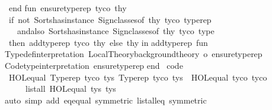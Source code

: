 \begin{isabellebody}
\ \ end{\isacharsemicolon}{\kern0pt}\isanewline
\isanewline
fun\ ensure{\isacharunderscore}{\kern0pt}typerep\ tyco\ thy\ {\isacharequal}{\kern0pt}\isanewline
\ \ if\ not\ {\isacharparenleft}{\kern0pt}Sorts{\isachardot}{\kern0pt}has{\isacharunderscore}{\kern0pt}instance\ {\isacharparenleft}{\kern0pt}Sign{\isachardot}{\kern0pt}classes{\isacharunderscore}{\kern0pt}of\ thy{\isacharparenright}{\kern0pt}\ tyco\ \isactrlsort {\isasymopen}typerep{\isasymclose}{\isacharparenright}{\kern0pt}\isanewline
\ \ \ \ andalso\ Sorts{\isachardot}{\kern0pt}has{\isacharunderscore}{\kern0pt}instance\ {\isacharparenleft}{\kern0pt}Sign{\isachardot}{\kern0pt}classes{\isacharunderscore}{\kern0pt}of\ thy{\isacharparenright}{\kern0pt}\ tyco\ \isactrlsort {\isasymopen}type{\isasymclose}\isanewline
\ \ then\ add{\isacharunderscore}{\kern0pt}typerep\ tyco\ thy\ else\ thy{\isacharsemicolon}{\kern0pt}\isanewline
\isanewline
in\isanewline
\isanewline
add{\isacharunderscore}{\kern0pt}typerep\ \isactrltypeUNDERSCOREname {\isasymopen}fun{\isasymclose}\isanewline
{\isacharhash}{\kern0pt}{\isachargreater}{\kern0pt}\ Typedef{\isachardot}{\kern0pt}interpretation\ {\isacharparenleft}{\kern0pt}Local{\isacharunderscore}{\kern0pt}Theory{\isachardot}{\kern0pt}background{\isacharunderscore}{\kern0pt}theory\ o\ ensure{\isacharunderscore}{\kern0pt}typerep{\isacharparenright}{\kern0pt}\isanewline
{\isacharhash}{\kern0pt}{\isachargreater}{\kern0pt}\ Code{\isachardot}{\kern0pt}type{\isacharunderscore}{\kern0pt}interpretation\ ensure{\isacharunderscore}{\kern0pt}typerep\isanewline
\isanewline
end\isanewline
{\isacartoucheclose}%
\endisatagML
{\isafoldML}%
%
\isadelimML
\isanewline
%
\endisadelimML
\isanewline
{}\isamarkupfalse%
\ {\isacharbrackleft}{\kern0pt}code{\isacharbrackright}{\kern0pt}{\isacharcolon}{\kern0pt}\isanewline
\ \ {\isachardoublequoteopen}HOL{\isachardot}{\kern0pt}equal\ {\isacharparenleft}{\kern0pt}Typerep\ tyco{}\ tys{}{\isacharparenright}{\kern0pt}\ {\isacharparenleft}{\kern0pt}Typerep\ tyco{}\ tys{}{\isacharparenright}{\kern0pt}\ {\isasymlongleftrightarrow}\ HOL{\isachardot}{\kern0pt}equal\ tyco{}\ tyco{}\isanewline
\ \ \ \ \ {\isasymand}\ list{\isacharunderscore}{\kern0pt}all{}\ HOL{\isachardot}{\kern0pt}equal\ tys{}\ tys{}{\isachardoublequoteclose}\isanewline
%
\isadelimproof
\ \ %
\endisadelimproof
%
\isatagproof
{}\isamarkupfalse%
\ {\isacharparenleft}{\kern0pt}auto\ simp\ add{\isacharcolon}{\kern0pt}\ eq{\isacharunderscore}{\kern0pt}equal\ {\isacharbrackleft}{\kern0pt}symmetric{\isacharbrackright}{\kern0pt}\ list{\isacharunderscore}{\kern0pt}all{}{\isacharunderscore}{\kern0pt}eq\ {\isacharbrackleft}{\kern0pt}symmetric{\isacharbrackright}{\kern0pt}{\isacharparenright}{\kern0pt}%

\end{isabellebody}
